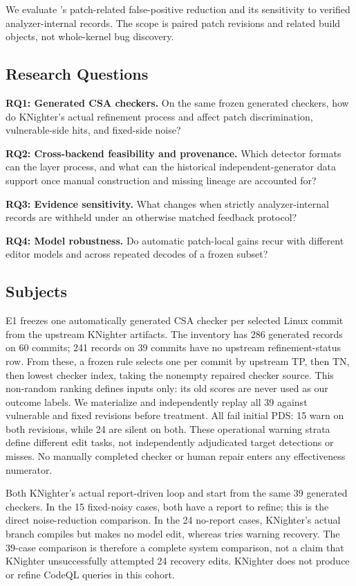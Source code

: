 We evaluate \toolname's patch-related false-positive reduction and its sensitivity to verified analyzer-internal records.  The scope is paired patch revisions and related build objects, not whole-kernel bug discovery.

\subsection{Research Questions}

\textbf{RQ1: Generated CSA checkers.} On the same frozen generated checkers, how do KNighter's actual refinement process and \toolname affect patch discrimination, vulnerable-side hits, and fixed-side noise?

\textbf{RQ2: Cross-backend feasibility and provenance.} Which detector formats can the layer process, and what can the historical independent-generator data support once manual construction and missing lineage are accounted for?

\textbf{RQ3: Evidence sensitivity.} What changes when strictly analyzer-internal records are withheld under an otherwise matched feedback protocol?

\textbf{RQ4: Model robustness.} Do automatic patch-local gains recur with different editor models and across repeated decodes of a frozen subset?

\subsection{Subjects}

E1 freezes one automatically generated CSA checker per selected Linux commit from the upstream KNighter artifacts. The inventory has 286 generated records on 60 commits; 241 records on 39 commits have no upstream refinement-status row. From these, a frozen rule selects one per commit by upstream TP, then TN, then lowest checker index, taking the nonempty repaired checker source. This non-random ranking defines inputs only: its old scores are never used as our outcome labels. We materialize and independently replay all 39 against vulnerable and fixed revisions before treatment. All fail initial PDS: 15 warn on both revisions, while 24 are silent on both. These operational warning strata define different edit tasks, not independently adjudicated target detections or misses. No manually completed checker or human repair enters any effectiveness numerator.

Both KNighter's actual report-driven loop and \toolname start from the same 39 generated checkers. In the 15 fixed-noisy cases, both have a report to refine; this is the direct noise-reduction comparison. In the 24 no-report cases, KNighter's actual branch compiles but makes no model edit, whereas \toolname tries warning recovery. The 39-case comparison is therefore a complete system comparison, not a claim that KNighter unsuccessfully attempted 24 recovery edits. KNighter does not produce or refine CodeQL queries in this cohort.

